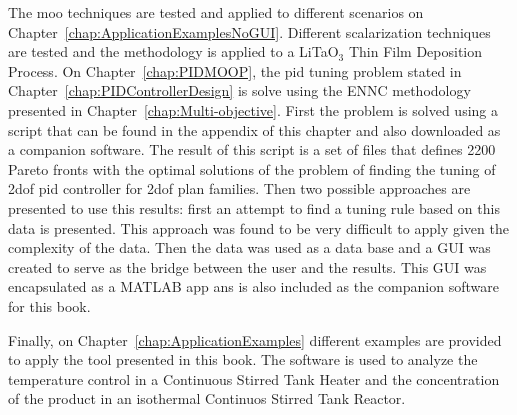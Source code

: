 The \gls{moo} techniques are tested and applied to different scenarios on Chapter~\ref{chap:ApplicationExamplesNoGUI}. Different scalarization techniques are tested and the methodology is applied to a LiTaO$_3$ Thin Film Deposition Process. On Chapter~\ref{chap:PIDMOOP}, the \gls{pid} tuning problem stated in Chapter~\ref{chap:PIDControllerDesign} is solve using the ENNC methodology presented in Chapter~\ref{chap:Multi-objective}. First the problem is solved using a \matlab script that can be found in the appendix of this chapter and also downloaded as a companion software. The result of this script is a set of files that defines 2200 Pareto fronts with the optimal solutions of the problem of finding the tuning of \gls{2dof} \gls{pid} controller for \gls{2dof} plan families. Then two possible approaches are presented to use this results: first an attempt to find a tuning rule based on this data is presented. This approach was found to be very difficult to apply given the complexity of the data. Then the data was used as a data base and a GUI was created to serve as the bridge between the user and the results. This GUI was encapsulated as a MATLAB app ans is also included as the companion software for this book.

Finally, on Chapter~\ref{chap:ApplicationExamples} different examples are provided to apply the tool presented in this book. The software is used to analyze the temperature control in a Continuous Stirred Tank Heater and the concentration of the product in an isothermal Continuos Stirred Tank Reactor.


